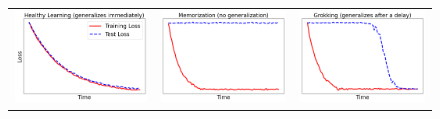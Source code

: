 \documentclass{article}
\begin{document}
\begin{figure}[t]
    \centering
    \begin{tabular}{ccc}
        \includegraphics[scale=0.3]{no-grok.png} & 
        \includegraphics[scale=0.3]{mem.png} &
        \includegraphics[scale=0.3]{grok.png} \\

\end{tabular}
\end{figure}
\end{document}
